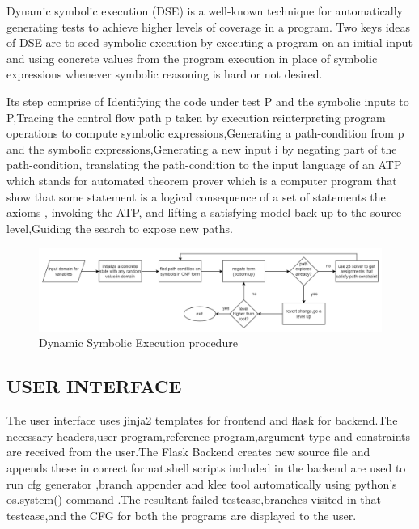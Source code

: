 Dynamic symbolic execution (DSE) is a well-known technique
for automatically generating tests to achieve higher levels of coverage in a program. Two keys ideas of DSE are to seed symbolic execution by executing a program on an initial input and using concrete values from the program execution in place of symbolic expressions whenever symbolic reasoning is hard or not desired.

Its step comprise of Identifying the code under test P and the symbolic inputs to P,Tracing the control flow path p taken by execution reinterpreting program operations to compute symbolic expressions,Generating a path-condition from p and the symbolic expressions,Generating a new input i by negating part of the path-condition, translating the path-condition to the input language of an ATP which stands for automated theorem prover which is a  computer program that show that some statement  is a logical consequence of a set of statements the axioms , invoking the ATP, and lifting a satisfying model back up to the source level,Guiding the search to expose new paths.

 

\begin{figure}[h]
\centering
\includegraphics[width=1\textwidth]{3/k.png}
\caption{Dynamic Symbolic Execution procedure}
\label{fig:path}
\end{figure}

\subsection{USER INTERFACE}

The user interface uses jinja2 templates for frontend and flask for backend.The necessary headers,user program,reference program,argument type and constraints are received from the user.The Flask Backend creates new source file and appends these in correct format.shell scripts included in the backend are used to run cfg generator ,branch appender and klee tool  automatically using python's os.system() command .The resultant failed testcase,branches visited in that testcase,and the CFG for both the programs are displayed to the user.















